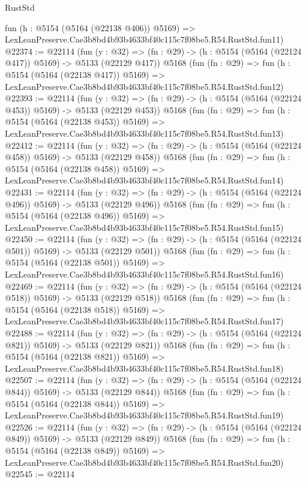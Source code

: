 \begin{lexlean}{RustStd}
\begin{coremodule}
    fun (h : @5154 (@5164 (@22138 @406)) @5169) =>
    LexLeanPreserve.Cae3b8bd4b93b4633bf40c115c7f08be5.R54.RustStd.fun11)
@22374 := @22114
    (fun (y : @32) => (fn : @29) -> (h : @5154 (@5164 (@22124 @417)) @5169) -> @5133 (@22129 @417))
    @5168
    (fun (fn : @29) =>
    fun (h : @5154 (@5164 (@22138 @417)) @5169) =>
    LexLeanPreserve.Cae3b8bd4b93b4633bf40c115c7f08be5.R54.RustStd.fun12)
@22393 := @22114
    (fun (y : @32) => (fn : @29) -> (h : @5154 (@5164 (@22124 @453)) @5169) -> @5133 (@22129 @453))
    @5168
    (fun (fn : @29) =>
    fun (h : @5154 (@5164 (@22138 @453)) @5169) =>
    LexLeanPreserve.Cae3b8bd4b93b4633bf40c115c7f08be5.R54.RustStd.fun13)
@22412 := @22114
    (fun (y : @32) => (fn : @29) -> (h : @5154 (@5164 (@22124 @458)) @5169) -> @5133 (@22129 @458))
    @5168
    (fun (fn : @29) =>
    fun (h : @5154 (@5164 (@22138 @458)) @5169) =>
    LexLeanPreserve.Cae3b8bd4b93b4633bf40c115c7f08be5.R54.RustStd.fun14)
@22431 := @22114
    (fun (y : @32) => (fn : @29) -> (h : @5154 (@5164 (@22124 @496)) @5169) -> @5133 (@22129 @496))
    @5168
    (fun (fn : @29) =>
    fun (h : @5154 (@5164 (@22138 @496)) @5169) =>
    LexLeanPreserve.Cae3b8bd4b93b4633bf40c115c7f08be5.R54.RustStd.fun15)
@22450 := @22114
    (fun (y : @32) => (fn : @29) -> (h : @5154 (@5164 (@22124 @501)) @5169) -> @5133 (@22129 @501))
    @5168
    (fun (fn : @29) =>
    fun (h : @5154 (@5164 (@22138 @501)) @5169) =>
    LexLeanPreserve.Cae3b8bd4b93b4633bf40c115c7f08be5.R54.RustStd.fun16)
@22469 := @22114
    (fun (y : @32) => (fn : @29) -> (h : @5154 (@5164 (@22124 @518)) @5169) -> @5133 (@22129 @518))
    @5168
    (fun (fn : @29) =>
    fun (h : @5154 (@5164 (@22138 @518)) @5169) =>
    LexLeanPreserve.Cae3b8bd4b93b4633bf40c115c7f08be5.R54.RustStd.fun17)
@22488 := @22114
    (fun (y : @32) => (fn : @29) -> (h : @5154 (@5164 (@22124 @821)) @5169) -> @5133 (@22129 @821))
    @5168
    (fun (fn : @29) =>
    fun (h : @5154 (@5164 (@22138 @821)) @5169) =>
    LexLeanPreserve.Cae3b8bd4b93b4633bf40c115c7f08be5.R54.RustStd.fun18)
@22507 := @22114
    (fun (y : @32) => (fn : @29) -> (h : @5154 (@5164 (@22124 @844)) @5169) -> @5133 (@22129 @844))
    @5168
    (fun (fn : @29) =>
    fun (h : @5154 (@5164 (@22138 @844)) @5169) =>
    LexLeanPreserve.Cae3b8bd4b93b4633bf40c115c7f08be5.R54.RustStd.fun19)
@22526 := @22114
    (fun (y : @32) => (fn : @29) -> (h : @5154 (@5164 (@22124 @849)) @5169) -> @5133 (@22129 @849))
    @5168
    (fun (fn : @29) =>
    fun (h : @5154 (@5164 (@22138 @849)) @5169) =>
    LexLeanPreserve.Cae3b8bd4b93b4633bf40c115c7f08be5.R54.RustStd.fun20)
@22545 := @22114

\end{coremodule}
\end{lexlean}
